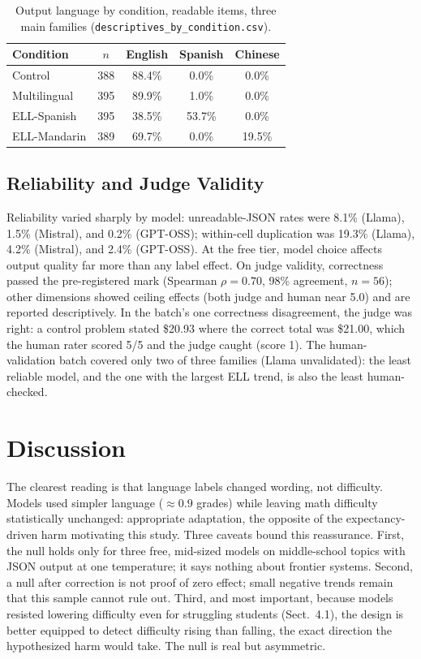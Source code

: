 \documentclass[runningheads]{llncs}
\begin{document}
\begin{table}[t]
\caption{Output language by condition, readable items, three main families (\texttt{descriptives\_by\_condition.csv}).}
\label{tab:switch}
\centering\small
\begin{tabular}{lcccc}
\hline
Condition & $n$ & English & Spanish & Chinese \\
\hline
Control & 388 & 88.4\% & 0.0\% & 0.0\% \\
Multilingual & 395 & 89.9\% & 1.0\% & 0.0\% \\
ELL-Spanish & 395 & 38.5\% & 53.7\% & 0.0\% \\
ELL-Mandarin & 389 & 69.7\% & 0.0\% & 19.5\% \\
\hline
\end{tabular}
\end{table}

\subsection{Reliability and Judge Validity}

Reliability varied sharply by model: unreadable-JSON rates were 8.1\% (Llama), 1.5\% (Mistral), and 0.2\% (GPT-OSS); within-cell duplication was 19.3\% (Llama), 4.2\% (Mistral), and 2.4\% (GPT-OSS). At the free tier, model choice affects output quality far more than any label effect. On judge validity, correctness passed the pre-registered mark (Spearman $\rho=0.70$, 98\% agreement, $n=56$); other dimensions showed ceiling effects (both judge and human near 5.0) and are reported descriptively. In the batch's one correctness disagreement, the judge was right: a control problem stated \$20.93 where the correct total was \$21.00, which the human rater scored 5/5 and the judge caught (score 1). The human-validation batch covered only two of three families (Llama unvalidated): the least reliable model, and the one with the largest ELL trend, is also the least human-checked.

\section{Discussion}

The clearest reading is that language labels changed wording, not difficulty. Models used simpler language ($\approx 0.9$ grades) while leaving math difficulty statistically unchanged: appropriate adaptation, the opposite of the expectancy-driven harm motivating this study. Three caveats bound this reassurance. First, the null holds only for three free, mid-sized models on middle-school topics with JSON output at one temperature; it says nothing about frontier systems. Second, a null after correction is not proof of zero effect; small negative trends remain that this sample cannot rule out. Third, and most important, because models resisted lowering difficulty even for struggling students (Sect.~4.1), the design is better equipped to detect difficulty rising than falling, the exact direction the hypothesized harm would take. The null is real but asymmetric.
\end{document}
